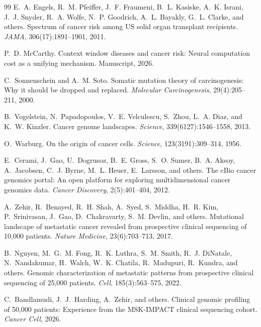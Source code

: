 \documentclass[11pt]{article}
\begin{document}
\begin{thebibliography}{99}
E.~A. Engels, R.~M. Pfeiffer, J.~F. Fraumeni, B.~L. Kasiske,
  A.~K. Israni, J.~J. Snyder, R.~A. Wolfe, N.~P. Goodrich,
  A.~L. Bayakly, G.~L. Clarke, and others.
\newblock Spectrum of cancer risk among {US} solid organ transplant
  recipients.
\newblock \emph{JAMA}, 306(17):1891--1901, 2011.

P.~D. McCarthy.
\newblock Context window diseases and cancer risk: Neural computation
  cost as a unifying mechanism.
\newblock Manuscript, 2026.

C.~Sonnenschein and A.~M. Soto.
\newblock Somatic mutation theory of carcinogenesis: Why it should be dropped
  and replaced.
\newblock \emph{Molecular Carcinogenesis}, 29(4):205--211, 2000.

B.~Vogelstein, N.~Papadopoulos, V.~E. Velculescu, S.~Zhou, L.~A. Diaz, and
  K.~W. Kinzler.
\newblock Cancer genome landscapes.
\newblock \emph{Science}, 339(6127):1546--1558, 2013.

O.~Warburg.
\newblock On the origin of cancer cells.
\newblock \emph{Science}, 123(3191):309--314, 1956.

E.~Cerami, J.~Gao, U.~Dogrusoz, B.~E. Gross, S.~O. Sumer,
  B.~A. Aksoy, A.~Jacobsen, C.~J. Byrne, M.~L. Heuer,
  E.~Larsson, and others.
\newblock The {cBio} cancer genomics portal: An open platform for
  exploring multidimensional cancer genomics data.
\newblock \emph{Cancer Discovery}, 2(5):401--404, 2012.

A.~Zehir, R.~Benayed, R.~H. Shah, A.~Syed, S.~Middha,
  H.~R. Kim, P.~Srinivasan, J.~Gao, D.~Chakravarty,
  S.~M. Devlin, and others.
\newblock Mutational landscape of metastatic cancer revealed from
  prospective clinical sequencing of 10,000 patients.
\newblock \emph{Nature Medicine}, 23(6):703--713, 2017.

B.~Nguyen, M.~G.~M. Fong, R.~K. Luthra, S.~M. Smith,
  R.~J. DiNatale, N.~Nandakumar, H.~Walch, W.~K. Chatila,
  R.~Madupuri, R.~Kundra, and others.
\newblock Genomic characterization of metastatic patterns from
  prospective clinical sequencing of 25,000 patients.
\newblock \emph{Cell}, 185(3):563--575, 2022.

C.~Bandlamudi, J.~J.~Harding, A.~Zehir, and others.
\newblock Clinical genomic profiling of 50,000 patients:
  Experience from the {MSK-IMPACT} clinical sequencing cohort.
\newblock \emph{Cancer Cell}, 2026.


\end{thebibliography}
\end{document}
